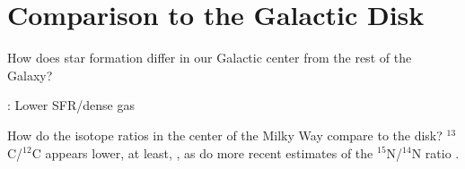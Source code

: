 \section{Comparison to the Galactic Disk}
How does star formation differ in our Galactic center from the rest of the Galaxy? 

\citet{Longmore2013b}: Lower SFR/dense gas

How do the isotope ratios in the center of the Milky Way compare to the disk? $^{13}$C/$^{12}$C appears lower, at least, \citep[e.g.,][]{Riq10}, as do more recent estimates of the $^{15}$N/$^{14}$N ratio \citep{AZ11}.